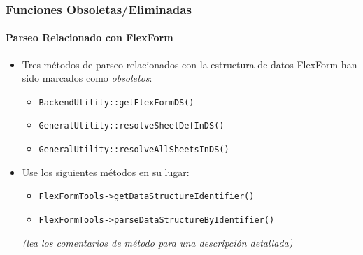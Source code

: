 \begin{frame}[fragile]
	\frametitle{Funciones Obsoletas/Eliminadas}
	\framesubtitle{Parseo Relacionado con FlexForm}

	\begin{itemize}
		\item Tres métodos de parseo relacionados con la estructura de datos FlexForm han sido marcados como \textit{obsoletos}:

			\begin{itemize}
				\item \texttt{BackendUtility::getFlexFormDS()}
				\item \texttt{GeneralUtility::resolveSheetDefInDS()}
				\item \texttt{GeneralUtility::resolveAllSheetsInDS()}
			\end{itemize}

		\item Use los siguientes métodos en su lugar:

			\begin{itemize}
				\item \texttt{FlexFormTools->getDataStructureIdentifier()}
				\item \texttt{FlexFormTools->parseDataStructureByIdentifier()}
			\end{itemize}

		\small
			\textit{(lea los comentarios de método para una descripción detallada)}
		\normalsize

	\end{itemize}

\end{frame}







